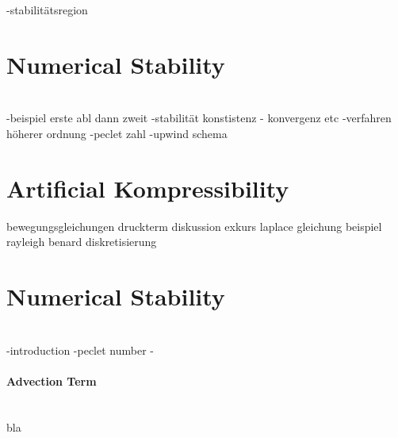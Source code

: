 -stabilitätsregion

\section{Numerical Stability}\mbox{}\\

-beispiel erste abl dann zweit
-stabilität konstistenz - konvergenz etc
-verfahren höherer ordnung
-peclet zahl
-upwind schema



\newpage

\section{Artificial Kompressibility}
bewegungsgleichungen
druckterm diskussion
exkurs laplace gleichung
beispiel rayleigh benard diskretisierung

\section{Numerical Stability}\mbox{}\\
-introduction
-peclet number
-


\paragraph{Advection Term}\mbox{}\\
bla



